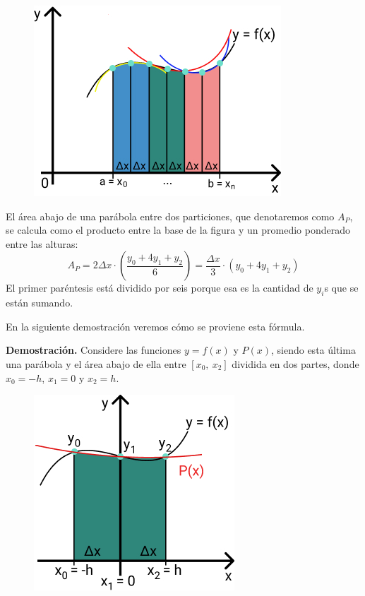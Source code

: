 \documentclass[12pt]{article}
\begin{document}
\begin{figure}[hbt!]
\centering
\includegraphics[scale=0.6]{img/simpson's-rule-num-int.jpg}
\end{figure}

El área abajo de una parábola entre dos particiones, que denotaremos como $A_{P}$, se calcula como el producto entre la base de la figura y un promedio ponderado entre las alturas:
\[
  A_{P} = 2\Delta x \cdot \left(\frac{y_{0} + 4y_{1} + y_{2}}{6}\right) = \frac{\Delta x}{3} \cdot (y_{0} + 4y_{1} + y_{2})
\]
El primer paréntesis está dividido por seis porque esa es la cantidad de $y_{i}$s que se están sumando.

En la siguiente demostración veremos cómo se proviene esta fórmula.

\textbf{Demostración.} Considere las funciones $y = f(x)$ y $P(x)$, siendo esta última una parábola y el área abajo de ella entre $[x_{0}, \ x_{2}]$ dividida en dos partes, donde $x_{0} = -h$, $x_{1} = 0$ y $x_{2} = h$.

\newpage

\begin{figure}[hbt!]
\centering
\includegraphics[scale=0.6]{img/simpson's-rule-num-int-2.jpg}
\end{figure}
\end{document}
